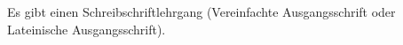 Es gibt einen Schreibschriftlehrgang (Vereinfachte Ausgangsschrift oder Lateinische Ausgangsschrift).